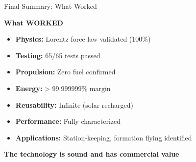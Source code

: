 \documentclass[aspectratio=169]{beamer}
\begin{document}
\begin{frame}{Final Summary: What Worked}
\begin{center}
\Large\textbf{What WORKED}

\vspace{1em}
\end{center}

\begin{itemize}
    \item[\textcolor{green}{\checkmark}] \textbf{Physics:} Lorentz force law validated (100\%)
    \item[\textcolor{green}{\checkmark}] \textbf{Testing:} 65/65 tests passed
    \item[\textcolor{green}{\checkmark}] \textbf{Propulsion:} Zero fuel confirmed
    \item[\textcolor{green}{\checkmark}] \textbf{Energy:} > 99.999999\% margin
    \item[\textcolor{green}{\checkmark}] \textbf{Reusability:} Infinite (solar recharged)
    \item[\textcolor{green}{\checkmark}] \textbf{Performance:} Fully characterized
    \item[\textcolor{green}{\checkmark}] \textbf{Applications:} Station-keeping, formation flying identified
\end{itemize}

\vspace{1em}
\begin{center}
\textbf{The technology is sound and has commercial value}
\end{center}
\end{frame}
\end{document}
